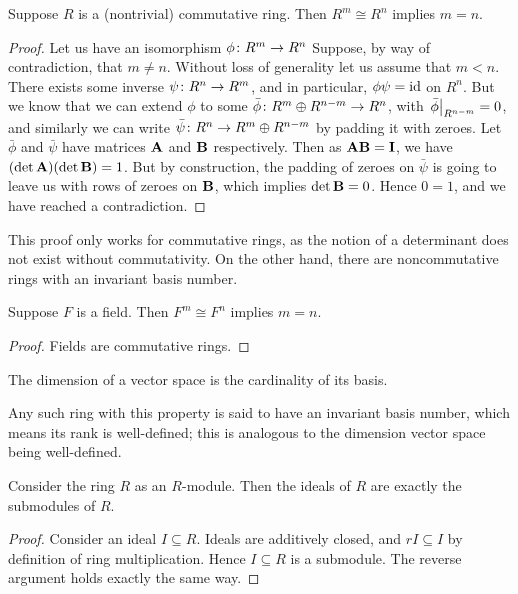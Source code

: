\begin{theorem}
    Suppose \(R\) is a (nontrivial) commutative ring.
    Then \(R^m \cong R^n\) implies \(m = n\).
\end{theorem}
\begin{proof}
    Let us have an isomorphism \(\phi\colon R^m\to R^n\)
    Suppose, by way of contradiction, that \(m \neq n\).
    Without loss of generality let us assume that \(m < n\).
    There exists some inverse \(\psi\colon R^n\to R^m\),
    and in particular, \(\phi\psi = \operatorname{id}\) on \(R^n\).
    But we know that we can extend \(\phi\) to some \(\bar{\phi}\colon R^m \oplus R^{n-m}\to R^n\),
    with \(\eval{\bar{\phi}}_{R^{n-m}} = 0\),
    and similarly we can write \(\bar{\psi}\colon R^n\to R^m \oplus R^{n-m}\)
    by padding it with zeroes.
    Let \(\bar{\phi}\) and \(\bar{\psi}\) have matrices \(\vb{A}\) and \(\vb{B}\) respectively.
    Then as \(\vb{A}\vb{B} = \vb{I}\), we have \((\det\vb{A})(\det\vb{B}) = 1\).
    But by construction, the padding of zeroes on \(\bar{\psi}\)
    is going to leave us with rows of zeroes on \(\vb{B}\),
    which implies \(\det\vb{B} = 0\).
    Hence \(0 = 1\), and we have reached a contradiction.
\end{proof}
\begin{remark}
    This proof only works for commutative rings,
    as the notion of a determinant does not exist without commutativity.
    On the other hand, there are noncommutative rings with an invariant basis number.
\end{remark}
\begin{corollary}
    Suppose \(F\) is a field.
    Then \(F^m \cong F^n\) implies \(m = n\).
\end{corollary}
\begin{proof}
    Fields are commutative rings.
\end{proof}
\begin{definition}
    The dimension of a vector space is the cardinality of its basis.
\end{definition}
\begin{remark}
    Any such ring with this property is said to have an invariant basis number,
    which means its rank is well-defined;
    this is analogous to the dimension vector space being well-defined.
\end{remark}

\begin{proposition}\label{prop:ideal-submodule}
    Consider the ring \(R\) as an \(R\)-module.
    Then the ideals of \(R\) are exactly the submodules of \(R\).
\end{proposition}
\begin{proof}
    Consider an ideal \(I \subseteq R\).
    Ideals are additively closed, and \(rI \subseteq I\) by definition of ring multiplication.
    Hence \(I \subseteq R\) is a submodule.
    The reverse argument holds exactly the same way.
\end{proof}


